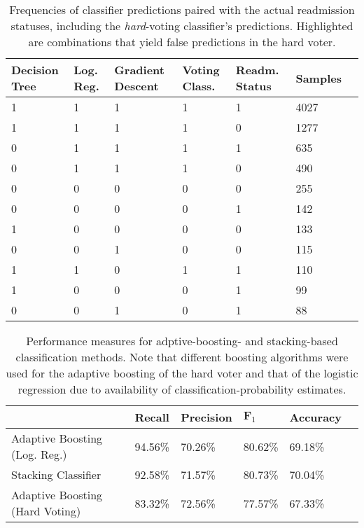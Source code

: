 \documentclass[10pt, twoside, a4paper]{article}
\begin{document}
	\begin{table}
		\begin{center}
			\begin{tabular}{C{0.12\textwidth}C{0.12\textwidth}C{0.12\textwidth}C{0.12\textwidth}|C{0.12\textwidth}|C{0.12\textwidth}C{0.0cm}}
				Decision Tree & Log. Reg. & Gradient Descent & Voting Class. & Readm. Status & Samples &\\[10pt]
				& 1& 1& 1& 1&    4027&\\[10pt]
				\color{red}1& \color{red}1& \color{red}1& \color{red}1& \color{red}0& \color{red}   1277\color{black}&\\[10pt]
				0& 1& 1& 1& 1&     635&\\[10pt]
				\color{red}0& \color{red}1& \color{red}1& \color{red}1& \color{red}0& \color{red}    490&\\[10pt]
				0& 0& 0& 0& 0&     255&\\[10pt]
				\color{red}0& \color{red}0& \color{red}0& \color{red}0& \color{red}1& \color{red}    142&\\[10pt]
				1& 0& 0& 0& 0&     133&\\[10pt]
				0& 0& 1& 0& 0&     115&\\[10pt]
				1& 1& 0& 1& 1&     110&\\[10pt]
				\color{red}1& \color{red}0& \color{red}0& \color{red}0& \color{red}1& \color{red}     99&\\[10pt]
				\color{red}0& \color{red}0& \color{red}1& \color{red}0& \color{red}1& \color{red}     88&\\[10pt]
			\end{tabular}
		\end{center}
		\caption{Frequencies of classifier predictions paired with the actual readmission 
		statuses, including the \emph{hard}-voting classifier's predictions. Highlighted 
		are combinations that yield false predictions in the hard voter.}
		\label{table:predlabcomb}
	\end{table}
	\begin{table}
	\begin{center}
		\begin{tabular}{R{5.3cm}C{2cm}C{2cm}C{2cm}C{2cm}C{0.1cm}}
		& \textbf{Recall} & \textbf{Precision} & $\mathbf{F}_1$ & \textbf{Accuracy}& \\[10pt]
		\hline
		Adaptive Boosting (Log. Reg.) & 94.56\% & 70.26\% & 80.62\% & 69.18\% &\\[10pt]
		Stacking Classifier & 92.58\% & 71.57\% & 80.73\% & 70.04\% &\\[10pt]
		Adaptive Boosting (Hard Voting) & 83.32\% & 72.56\% & 77.57\% & 67.33\%&\\[10pt]
		\end{tabular}
		
		\caption{Performance measures for adptive-boosting- and stacking-based 
		classification methods. Note that different boosting algorithms were used for the 
		adaptive boosting of the hard voter and that of the logistic regression due to 
		availability of classification-probability estimates.}
		\label{table:corrections}
	\end{center}
	\end{table}
\end{document}
